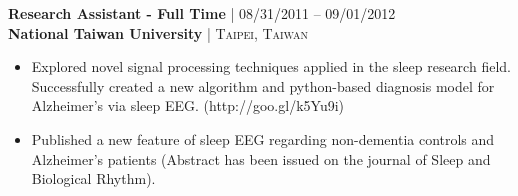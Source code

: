 {\raggedright\normalsize
\textbf{Research Assistant - Full Time} {\hfill\footnotesize\textsc{| 08/31/2011 -- 09/01/2012}} \\ 
\textbf{National Taiwan University} {\hfill\footnotesize\textsc{| Taipei, Taiwan}}}

\begin{itemize}[leftmargin=*, topsep=2pt, partopsep=2.5pt]
\setlength\itemsep{1pt}

\item Explored novel signal processing techniques applied in the sleep research field. Successfully created a new algorithm and python-based diagnosis model for Alzheimer’s via sleep EEG. (http://goo.gl/k5Yu9i)

\item Published a new feature of sleep EEG regarding non-dementia controls and Alzheimer’s patients (Abstract has been issued on the journal of Sleep and Biological Rhythm).

\end{itemize}
